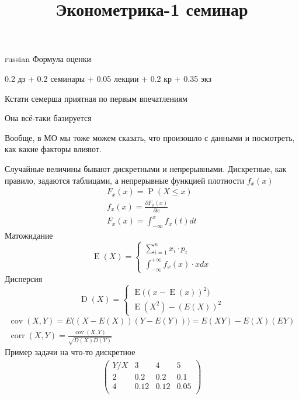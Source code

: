 \documentclass{article}
\begin{document}
\title{\foreignlanguage{russian}{Эконометрика-1 семинар}}
\maketitle

\begin{otherlanguage*}{russian}
Формула оценки 

0.2 дз + 0.2 семинары + 0.05 лекции + 0.2 кр + 0.35 экз

Кстати семерша приятная по первым впечатлениям

Она всё-таки базируется

Вообще, в МО мы тоже можем сказать, что произошло с данными и посмотреть, как какие факторы влияют.

Случайные величины бывают дискретными и непрерывными. Дискретные, как правило, задаются таблицами, а непрерывные функцией плотности $f_x(x)$
\begin{align}
F_x(x) = \operatorname{P}(X \le x) \\
f_x(x) = \frac{\partial F_x(x)}{\partial x} \\
F_x(x) = \int_{-\infty}^x f_x(t) dt
\end{align}
Матожидание
\begin{equation}
\operatorname{E} (X) = \begin{cases} 
\sum_{i=1}^n x_i \cdot p_i \\
\int_{-\infty}^{+\infty} f_x(x) \cdot x dx 
\end{cases}
\end{equation}
Дисперсия
\begin{equation}
\operatorname{D} (X) = \begin{cases} 
\operatorname{E} \big( (x - \operatorname{E}(x))^2\big) \\
\operatorname{E}(X^2) - (E(X))^2
\end{cases}
\end{equation}
\begin{align}
\operatorname{cov}(X, Y) = E \big( (X - E(X)) (Y - E(Y)) \big) = E(XY) - E(X)(EY) \\
\operatorname{corr}(X, Y) = \frac{\operatorname{cov}(X,Y)}{\sqrt{D(X)D(Y)}}
\end{align}
Пример задачи на что-то дискретное
\begin{align}
\begin{pmatrix}
Y / X & 3 & 4 & 5 \\
2 & 0.2 & 0.2 & 0.1 \\
4 & 0.12 & 0.12 & 0.05 \\

\end{pmatrix}
\end{align}
\end{otherlanguage*}
\end{document}
